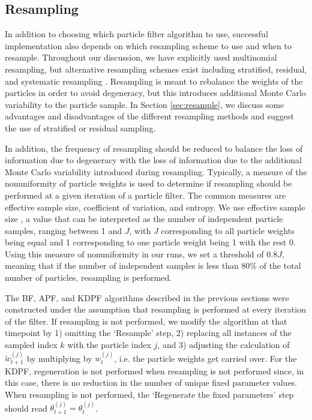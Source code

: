 \documentclass{elsarticle}
\begin{document}
\subsection{Resampling \label{sec:advice}}

In addition to choosing which particle filter algorithm to use, successful implementation also depends on which resampling scheme to use and when to resample. Throughout our discussion, we have explicitly used multinomial resampling, but alternative resampling schemes exist including stratified, residual, and systematic resampling \citep{Douc:Capp:Moul:comp:2005}. Resampling is meant to rebalance the weights of the particles in order to avoid degeneracy, but this introduces additional Monte Carlo variability to the particle sample. %
In Section \ref{sec:resample}, we discuss some advantages and disadvantages of the different resampling methods and suggest the use of stratified or residual sampling.

In addition, the frequency of resampling should be reduced to balance the loss of information due to degeneracy with the loss of information due to the additional Monte Carlo variability introduced during resampling. Typically, a measure of the nonuniformity of particle weights is used to determine if resampling should be performed at a given iteration of a particle filter. The common measures are effective sample size, coefficient of variation, and entropy. We use effective sample size \citep{Liu:Chen:Wong:reje:1998}, a value that can be interpreted as the number of independent particle samples, ranging between 1 and $J$, with $J$ corresponding to all particle weights being equal and 1 corresponding to one particle weight being 1 with the rest 0. Using this measure of nonuniformity in our runs, we set a threshold of $0.8J$, meaning that if the number of independent samples is less than 80\% of the total number of particles, resampling is performed.

The BF, APF, and KDPF algorithms described in the previous sections were constructed under the assumption that resampling is performed at every iteration of the filter. If resampling is not performed, we modify the algorithm at that timepoint by 1) omitting the `Resample' step, 2) replacing all instances of the sampled index $k$ with the particle index $j$, and 3) adjusting the calculation of $\tilde{w}_{t+1}^{(j)}$ by multiplying by $w_t^{(j)}$, i.e. the particle weights get carried over. For the KDPF, regeneration is not performed when resampling is not performed since, in this case, there is no reduction in the number of unique fixed parameter values. When resampling is not performed, the `Regenerate the fixed parameters' step should read $\theta_{t+1}^{(j)} = \theta_t^{(j)}$.
\end{document}
